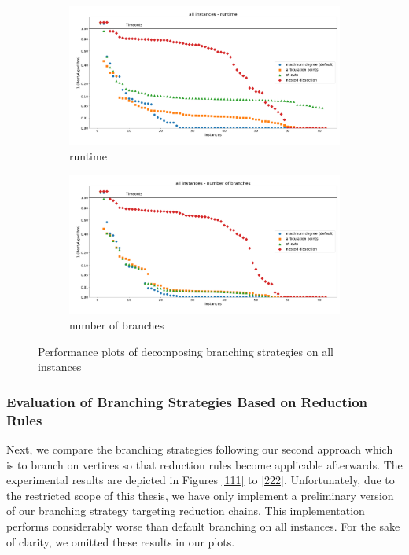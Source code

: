 \documentclass[12pt,a4paper,twoside]{scrartcl}
\numberwithin{equation}{section}
\begin{document}
\begin{figure}[hbt!]
	\begin{subfigure}{1\textwidth}
		\includegraphics[width=\textwidth]{images/plots/a1_all_t}
		\caption{runtime}
	\end{subfigure}
	\begin{subfigure}{1\textwidth}
		\includegraphics[width=\textwidth]{images/plots/a1_all_b}
		\caption{number of branches}
	\end{subfigure}
	\caption{Performance plots of decomposing branching strategies on all instances}
	\label{22}
\end{figure}
\clearpage

\subsubsection{Evaluation of Branching Strategies Based on Reduction Rules}
Next, we compare the branching strategies following our second approach which is to branch on vertices so that reduction rules become applicable afterwards. The experimental results are depicted in Figures \ref{111} to \ref{222}. Unfortunately, due to the restricted scope of this thesis, we have only implement a preliminary version of our branching strategy targeting reduction chains. This implementation performs considerably worse than default branching on all instances. For the sake of clarity, we omitted these results in our plots.
\end{document}
